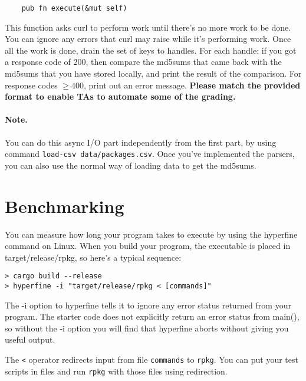 \documentclass[12pt]{article}
\renewcommand{\_}{\kern-1.5pt\textunderscore\kern-1.5pt}
\begin{document}
\vspace{1em}
\begin{verbatim}
    pub fn execute(&mut self)
\end{verbatim}
This function asks curl to perform work until there's no more work to be done. You can ignore any errors that curl may raise while it's performing work. Once all the work is done, drain the set of keys to handles. For each handle: if you got a response code of 200, then compare the md5sums that came back with the md5sums that you have stored locally, and print the result of the comparison. For response codes $\ge 400$, print out an error message. {\bf Please match the provided format to enable TAs to automate some of the grading.}

\paragraph{Note.} You can do this async I/O part independently from the first part, by using command
\texttt{load-csv data/packages.csv}. Once you've implemented the parsers, you can also
use the normal way of loading data to get the md5sums.

\section*{Benchmarking}

You can measure how long your program takes to execute by using the hyperfine command on Linux. When you build your program, the executable is placed in target/release/rpkg, so here's a typical sequence:\par

\begin{verbatim}
> cargo build --release
> hyperfine -i "target/release/rpkg < [commands]"
\end{verbatim}

\vspace{1em}
The -i option to hyperfine tells it to ignore any error status returned from your program. The starter code does not explicitly return an error status from main(), so without the -i option you will find that hyperfine aborts without giving you useful output.\par

\vspace{1em}
The \verb+<+ operator redirects input from file \texttt{commands} to \texttt{rpkg}. You can put your test scripts in files and run \texttt{rpkg} with those files using redirection.
\end{document}

